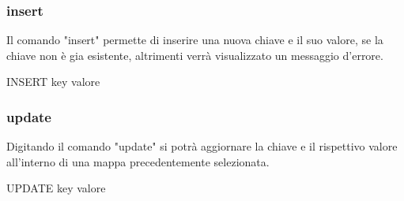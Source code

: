 \documentclass[a4paper]{article}
\begin{document}
			\subsubsection{insert}
			Il comando "insert" permette di inserire una nuova chiave e il suo valore, se la chiave non è gia esistente, altrimenti verrà visualizzato un messaggio d'errore.
			\begin{center}
				INSERT key valore
			\end{center}
			\subsubsection{update}
			Digitando il comando "update" si potrà aggiornare la chiave e il rispettivo valore all'interno di una mappa precedentemente selezionata.
			\begin{center}
				UPDATE key valore
			\end{center}
			
	\cleardoublepage
	\listoffigures
	
	\cleardoublepage
	\listoftables
		
\end{document}
